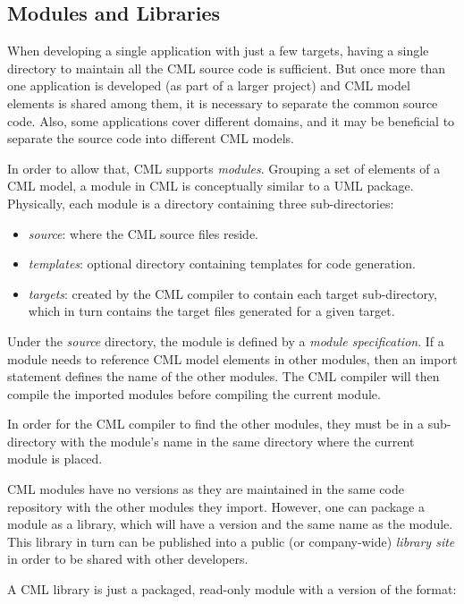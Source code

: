 \subsection{Modules and Libraries}\label{subsec:modlib}

When developing a single application with just a few targets, having a single directory to maintain all the CML source code is sufficient. But once more than one application is developed (as part of a larger project) and CML model elements is shared among them, it is necessary to separate the common source code. Also, some applications cover different domains, and it may be beneficial to separate the source code into different CML models.

In order to allow that, CML supports \emph{modules}. Grouping a set of elements of a CML model, a module in CML is conceptually similar to a UML \cite{uml} package. Physically, each module is a directory containing three sub-directories:

\begin{itemize}
\item \emph{source}: where the CML source files reside.
\item \emph{templates}: optional directory containing templates for code generation.
\item \emph{targets}: created by the CML compiler to contain each target sub-directory, which in turn contains the target files generated for a given target.
\end{itemize}

Under the \emph{source} directory, the module is defined by a \emph{module specification}. If a module needs to reference CML model elements in other modules, then an import statement defines the name of the other modules. The CML compiler will then compile the imported modules before compiling the current module.

In order for the CML compiler to find the other modules, they must be in a sub-directory with the module's name in the same directory where the current module is placed.

CML modules have no versions as they are maintained in the same code repository with the other modules they import. However, one can package a module as a library, which will have a version and the same name as the module. This library in turn can be published into a public (or company-wide) \emph{library site} in order to be shared with other developers.

A CML library is just a packaged, read-only module with a version of the format: 

